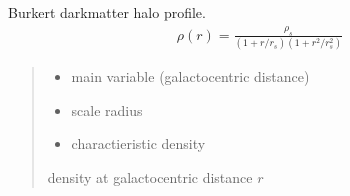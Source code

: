 \documentclass[letterpaper,10pt,english]{sphinxmanual}
\begin{document}
\begin{fulllineitems}
\label{\detokenize{diffsph.profiles:diffsph.profiles.templates.bkrt}}
\pysigstartsignatures
{}
\pysigstopsignatures
\sphinxAtStartPar
Burkert dark\sphinxhyphen{}matter halo profile.
\begin{equation*}
\begin{split}\rho(r) = \frac{\rho_s}{(1+r/r_s)(1+r^2/r_s^2)}\end{split}
\end{equation*}\begin{quote}\begin{description}
\begin{itemize}
\item {} 
\sphinxAtStartPar
{} \textendash{} main variable (galactocentric distance)

\item {} 
\sphinxAtStartPar
{} \textendash{} scale radius

\item {} 
\sphinxAtStartPar
{} \textendash{} charactieristic density

\end{itemize}

\sphinxAtStartPar
density at galactocentric distance \(r\)

\end{description}\end{quote}

\end{fulllineitems}

\end{document}
